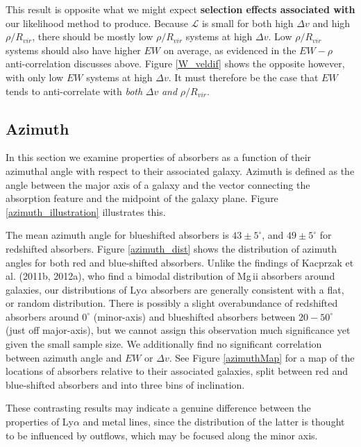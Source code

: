 \documentclass[twocolumn,tighten]{aastex6}
\begin{document}
This result is opposite what we might expect \textbf{selection effects associated with} our likelihood method to produce. Because $\mathcal{L}$ is small for both high $\Delta v$ and high $\rho / R_{vir}$, there should be mostly low $\rho / R_{vir}$ systems at high $\Delta v$. Low $\rho / R_{vir}$ systems should also have higher $EW$ on average, as evidenced in the $EW-\rho$ anti-correlation discusses above. Figure \ref{W_veldif} shows the opposite however, with only low $EW$ systems at high $\Delta v$. It must therefore be the case that $EW$ tends to anti-correlate with \textit{both} $\Delta v$ \textit{and} $\rho / R_{vir}$.


\subsection{Azimuth}
\label{azimuth}

In this section we examine properties of absorbers as a function of their azimuthal angle with respect to their associated galaxy. Azimuth is defined as the angle between the major axis of a galaxy and the vector connecting the absorption feature and the midpoint of the galaxy plane. Figure \ref{azimuth_illustration} illustrates this. 

The mean azimuth angle for blueshifted absorbers is $43\pm5^{\circ}$, and $49\pm5^{\circ}$ for redshifted absorbers. Figure \ref{azimuth_dist} shows the distribution of azimuth angles for both red and blue-shifted absorbers. Unlike the findings of Kacprzak et al. (2011b, 2012a), who find a bimodal distribution of Mg\,{\sc ii} absorbers around galaxies, our distributions of Ly$\alpha$ absorbers are generally consistent with a flat, or random distribution. There is possibly a slight overabundance of redshifted absorbers around $0^{\circ}$ (minor-axis) and blueshifted absorbers between $20-50^{\circ}$ (just off major-axis), but we cannot assign this observation much significance yet given the small sample size. We additionally find no significant correlation between azimuth angle and $EW$ or $\Delta v$. See Figure \ref{azimuthMap} for a map of the locations of absorbers relative to their associated galaxies, split between red and blue-shifted absorbers and into three bins of inclination.

These contrasting results may indicate a genuine difference between the properties of Ly$\alpha$ and metal lines, since the distribution of the latter is thought to be influenced by outflows, which may be focused along the minor axis.
\end{document}
